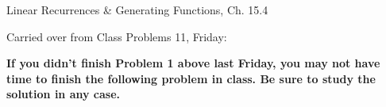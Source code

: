 \documentclass[handout]{mcs}
\begin{document}

\begin{staffnotes}
Linear Recurrences \& Generating Functions, Ch. 15.4
\end{staffnotes}


Carried over from Class Problems 11, Friday:




\begin{center}
\textbf{\large If you didn't finish Problem 1 above last Friday, you
  may not have time to finish the following problem in class.  Be sure
  to study the solution in any case.}
\end{center}




\end{document}
